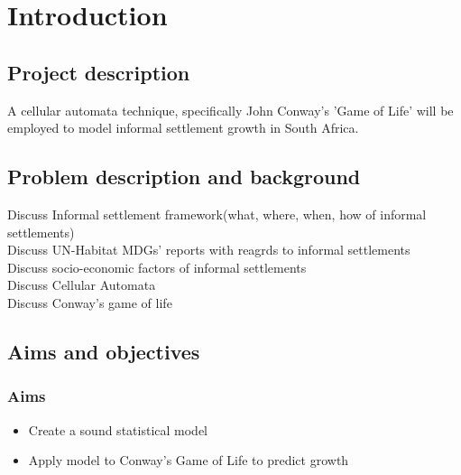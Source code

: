 
\chapter{Introduction} %

\label{Chapter1} %


\newcommand{\keyword}[1]{\textbf{#1}}
\newcommand{\tabhead}[1]{\textbf{#1}}
\newcommand{\code}[1]{\texttt{#1}}
\newcommand{\file}[1]{\texttt{\bfseries#1}}
\newcommand{\option}[1]{\texttt{\itshape#1}}


\section{Project description}
A cellular automata technique, specifically John Conway's 'Game of Life' will be employed to model informal settlement growth in South Africa.
\section{Problem description and background}
Discuss Informal settlement framework(what, where, when, how of informal settlements)\\
Discuss UN-Habitat MDGs’ reports with reagrds to informal settlements\\
Discuss socio-economic factors of informal settlements\\
Discuss Cellular Automata\\
Discuss Conway's game of life\\
\section{Aims and objectives}
\subsection{Aims}
\begin{itemize}
\item Create a sound statistical model
\item Apply model to Conway's Game of Life to predict growth
\end{itemize}
